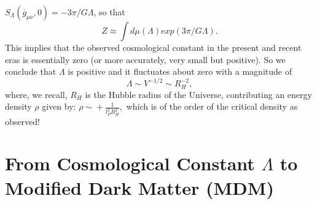 \documentclass[a4paper]{jpconf}
\begin{document}
$S_{\Lambda}(\overline{g}_{\mu \nu}, 0) = -3 \pi / G\Lambda$, so that 
\begin{equation}
Z \approx \int \! d\mu (\Lambda) exp(3 \pi /G \Lambda).
\label{finalZ}
\end{equation}
This implies that the observed cosmological constant in
the present and recent eras is essentially zero 
(or more accurately, very small but positive).  So we \cite{PRL}
conclude
that $\Lambda$ is positive and it fluctuates about zero with a magnitude of
\begin{equation}
\Lambda \sim V^{-1/2} \sim R_H^{-2}, 
\end{equation}
where, we recall, $R_H$ is the Hubble radius of the Universe,
contributing an energy density $\rho$ given by:
$
\rho \! \sim \! + \frac{1}{l_P^2 R_H^2},
$
which is of the order of the critical density as observed!\\

%

\section{\bf {From Cosmological Constant $\Lambda$ to Modified Dark Matter 
(MDM)}}
\end{document}
